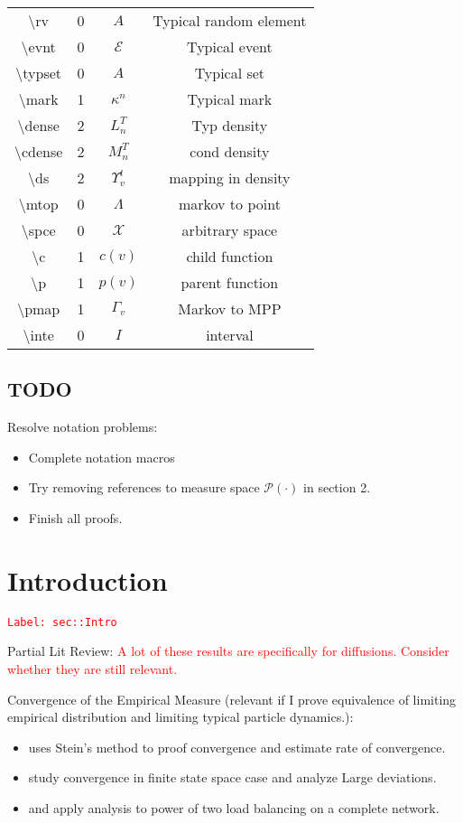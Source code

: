 \documentclass[12pt]{article}
\newcommand{\mc}{\mathcal}
\newcommand{\tr}{\textcolor{red}}
\newcommand{\labe}[1]{\tr{\texttt{Label: #1}}}
\newcommand{\tbs}{\textbackslash}
\newcommand{\pmsr}{\mc{P}}							%
\renewcommand{\v}{v}							%
\newcommand{\T}{T}								%
\renewcommand{\t}{t}							%
\newcommand{\rv}{A}								%
\newcommand{\evnt}{\mc{E}}						%
\newcommand{\typset}{A}							%
\renewcommand{\mark}[1]{\kappa^{#1}}				%
\newcommand{\dense}[2]{L_{#1}^{#2}}				%
\newcommand{\cdense}[2]{M_{#1}^{#2}}			%
\newcommand{\ds}[2]{\Upsilon_{#1}^{#2}}			%
\newcommand{\mtop}{\Lambda}						%
\newcommand{\spce}{\mc{X}}						%
\renewcommand{\c}[1]{c(#1)}						%
\newcommand{\p}[1]{p(#1)}						%
\newcommand{\pmap}[1]{\Gamma_{#1}}				%
\newcommand{\inte}{I}							%
\begin{document}
\begin{longtable}{c|c|c|c}
\tbs rv&0& \(\rv\)							&Typical random element\\
\tbs evnt&0&\(\evnt\)						&Typical event\\
\tbs typset&0&\(\typset\)					&Typical set\\
\tbs mark&1&\(\mark{n}\)				&Typical mark\\
\tbs dense&2& \(\dense{n}{\T}\)			&Typ density\\
\tbs cdense&2&\(\cdense{n}{\T}\)		&cond density\\
\tbs ds&2& \(\ds{\v}{\t}\)					&mapping in density\\
\tbs mtop &0& \(\mtop\)						&markov to point\\
\tbs spce &0&\(\spce\)						&arbitrary space\\
\tbs c &1& \(\c{\v}\)						&child function\\
\tbs p &1& \(\p{\v}\)						&parent function \\
\tbs pmap &1& \(\pmap{\v}\)					&Markov to MPP\\
\tbs inte &0& \(\inte\)						&interval
\end{longtable}

\subsection*{TODO}

Resolve notation problems:

\begin{itemize}
\item Complete notation macros

\item Try removing references to measure space \(\pmsr(\cdot)\) in section 2.

\item Finish all proofs.
\end{itemize}

\section{Introduction}
\label{sec::Intro}\labe{sec::Intro}

Partial Lit Review: \tr{A lot of these results are specifically for diffusions. Consider whether they are still relevant.}

Convergence of the Empirical Measure (relevant if I prove equivalence of limiting empirical distribution and limiting typical particle dynamics.):

\begin{itemize}
\item \cite{Yin15} uses Stein's method to proof convergence and estimate rate of convergence.

\item \cite{DupRamWu16} study convergence in finite state space case and analyze Large deviations.

\item \cite{VveDobKar96} and \cite{Mit01} apply analysis to power of two load balancing on a complete network. 
\end{itemize}
\end{document}

